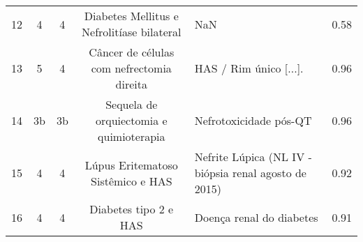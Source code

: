 \begin{table*}[h]
\begin{tabular}{lccclc}
    12 & 4   & 4   & Diabetes Mellitus e Nefrolitíase bilateral    & NaN                                                      & 0.58 \\
    13 & 5   & 4   & Câncer de células com nefrectomia direita     & HAS / Rim único [...].                                   & 0.96 \\
    14 & 3b  & 3b  & Sequela de orquiectomia e quimioterapia       & Nefrotoxicidade pós-QT                                   & 0.96 \\
    15 & 4   & 4   & Lúpus Eritematoso Sistêmico e HAS             & Nefrite Lúpica (NL IV - biópsia renal agosto de 2015)    & 0.92 \\
    16 & 4   & 4   & Diabetes tipo 2 e HAS                         & Doença renal do diabetes                                 & 0.91 \\
    \bottomrule
    \end{tabular}
    \label{tab:ckd_metrics}
    \end{table*}
    